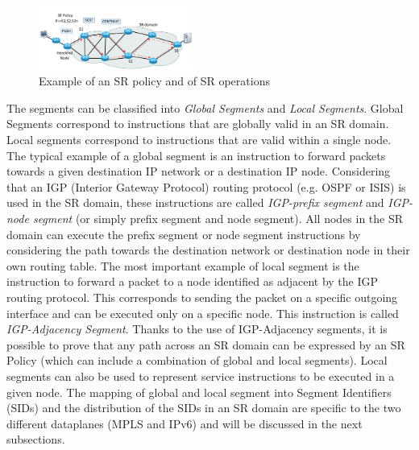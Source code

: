 \begin{figure}
    \centering
    \includegraphics[width=0.45\textwidth]{fig/sr-domain.pdf}
    \caption{Example of an SR policy and of SR operations}
    \label{fig:sr_operations}
    \vspace{-3ex}
\end{figure}


The segments can be classified into \textit{Global Segments} and \textit{Local Segments}. Global Segments correspond to instructions that are globally valid in an SR domain. Local segments correspond to instructions that are valid within a single node. The typical example of a global segment is an instruction to forward packets towards a given destination IP network or a destination IP node. Considering that an IGP (Interior Gateway Protocol) routing protocol (e.g. OSPF or ISIS) is used in the SR domain, these instructions are called \textit{IGP-prefix segment} and \textit{IGP-node segment} (or simply prefix segment and node segment). All nodes in the SR domain can execute the prefix segment or node segment instructions by considering the path towards the destination network or destination node in their own routing table. The most important example of local segment is the instruction to forward a packet to a node identified as adjacent by the IGP routing protocol. This corresponds to sending the packet on a specific outgoing interface and can be executed only on a specific node. This instruction is called \textit{IGP-Adjacency Segment}. Thanks to the use of IGP-Adjacency segments, it is possible to prove that any path across an SR domain can be expressed by an SR Policy (which can include a combination of global and local segments). Local segments can also be used to represent service instructions to be executed in a given node. The mapping of global and local segment into Segment Identifiers (SIDs) and the distribution of the SIDs in an SR domain are specific to the two different dataplanes (MPLS and IPv6) and will be discussed in the next subsections.


